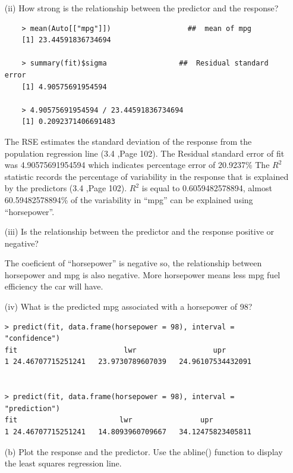 \documentclass{article}
\begin{document}
\begin{itemize}
\item[(ii)] How strong is the relationship between the predictor and the response?

\begin{program}
	\begin{verbatim}
	> mean(Auto[["mpg"]])	               ##  mean of mpg
	[1] 23.44591836734694
	
	> summary(fit)$sigma                 ##  Residual standard error
	[1] 4.90575691954594
	
	> 4.90575691954594 / 23.44591836734694
	[1] 0.2092371406691483
	\end{verbatim}
\end{program}

The RSE estimates the standard deviation of the response from the population regression line (3.4 ,Page 102).
The Residual standard error of fit was 4.90575691954594 which indicates percentage error of 20.9237\% 
\newline
The $R^2$ statistic records the percentage of variability in the response that is explained by the predictors (3.4 ,Page 102).
$R^2$ is equal to 0.6059482578894, almost 60.59482578894\% of the variability in “mpg” can be explained using “horsepower”.


\item[(iii)]  Is the relationship between the predictor and the response positive or negative?

The coeficient of “horsepower” is negative so, the relationship between horsepower and mpg is also negative. More horsepower means less mpg fuel efficiency the car will have.


\item[(iv)]  What is the predicted mpg associated with a horsepower of 98? 

\begin{program}
	\begin{verbatim}
> predict(fit, data.frame(horsepower = 98), interval = "confidence")
fit                         lwr                  upr
1 24.46707715251241   23.9730789607039   24.96107534432091


> predict(fit, data.frame(horsepower = 98), interval = "prediction")
fit                        lwr                upr
1 24.46707715251241   14.8093960709667   34.12475823405811

\end{verbatim}
\end{program}

\newpage
\item[(b)]  Plot the response and the predictor. Use the abline() function to display the least squares regression line.


\end{itemize}
\end{document}
